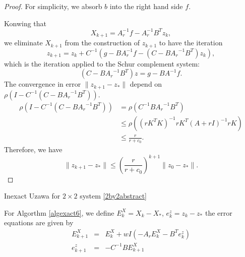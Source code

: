 \begin{itemize}
\begin{proof}
For simplicity, we absorb $b$ into the right hand side $f$. 

Konwing that 
\begin{equation}
    X_{k+1} = A_r^{-1} f - A_r^{-1} B^T z_{k},  
\end{equation}
we eliminate $X_{k+1}$ from the construction of $z_{k+1}$ to have the iteration 
\begin{equation}
    z_{k+1} = z_{k} + C^{-1} \left (g - B A_r^{-1}f - (C - B {A_r}^{-1} B^T) z_k \right),
\end{equation}
which is the iteration applied to the Schur complement system: 
\begin{equation}
    (C - B {A_r}^{-1} B^T) z = g - B A^{-1} f.
\end{equation}
The convergence in error $\| z_{k+1}-z_* \|$ depend on  $\rho( I - C^{-1} (C - B {A_r}^{-1} B^T))$.
\begin{equation*}
\begin{split}
\rho( I - C^{-1} (C - B {A_r}^{-1} B^T)) &=  \rho ( C^{-1} B {A_r}^{-1} B^T) \\
&\leq \rho( (rK^T K)^{-1} rK^T (A + rI)^{-1} rK )   \\ 
& \leq  \frac{r}{r + c_0}.
\end{split}
\end{equation*}
Therefore, we have 
\begin{equation}
    \| z_{k+1} - z_*\| \leq \left( \frac{r}{r +c_0}\right)^{k+1 } \| z_0 -z_*\|. 
\end{equation}

\end{proof}

\begin{algorithm}
\caption{Inexact Uzawa for $2 \times 2$ system \eqref{2by2abstract} }
\label{algexact6}
\begin{algorithmic}
\EndFor
\end{algorithmic}
\end{algorithm}

For Algorthm \ref{algexact6}, we define $E^X_{k} = X_k - X_*$, $e^z_{k} = z_k - z_*$ the error equations are given by 
\begin{eqnarray}
E^X_{k+1} &=& E^X_{k} + wI\left( -A_rE^X_{k} - B^Te^z_k \right) \label{erroreqn1}\\
e^z_{k+1} &=& -C^{-1}B E^X_{k+1} \label{erroreqn2}
\end{eqnarray}
    

\end{itemize}
